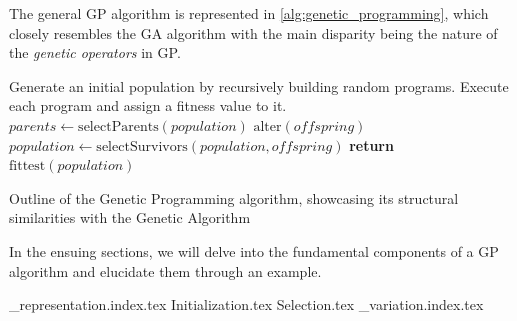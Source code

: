   The general GP algorithm is represented in \vref{alg:genetic_programming}, which
  closely resembles the GA algorithm with the main disparity being the nature of
  the \textit{genetic operators} in GP.

  \begin{algorithm}[ht!]
    \begin{algorithmic}[1]
      \State Generate an initial population by recursively building random programs.
      \State Execute each program and assign a fitness value to it.
      \Repeat
        \State \(\mathit{parents} \gets \mathrm{selectParents}(\mathit{population})\) 
        \State \(\mathrm{alter}(\mathit{offspring})\) 
        \State \(\mathit{population} \gets \mathrm{selectSurvivors}(
          \mathit{population}, \mathit{offspring})\) 
      \State \textbf{return} \(\mathrm{fittest}(\mathit{population})\) 
    \end{algorithmic}
    \caption{
      Outline of the Genetic Programming algorithm, showcasing its structural 
      similarities with the Genetic Algorithm
    }
    \label{alg:genetic_programming}
  \end{algorithm}

  In the ensuing sections, we will delve into the fundamental components of a GP
  algorithm and elucidate them through an example.

  {_representation.index.tex}
  {Initialization.tex}
  {Selection.tex}
  {_variation.index.tex}
%